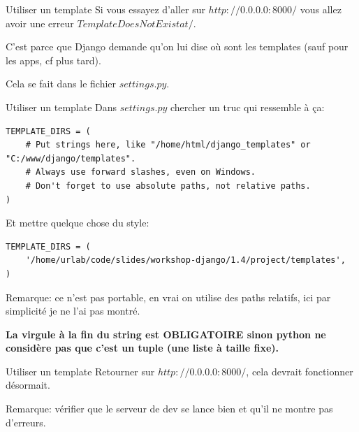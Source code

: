 \documentclass{beamer}
\begin{document}
\begin{frame}[fragile]{Utiliser un template}
    Si vous essayez d'aller sur $http://0.0.0.0:8000/$ vous allez avoir une erreur $TemplateDoesNotExist at /$.

    \vspace{3mm}

    C'est parce que Django demande qu'on lui dise où sont les templates (sauf pour les apps, cf plus tard).

    \vspace{3mm}

    Cela se fait dans le fichier $settings.py$.
\end{frame}

\begin{frame}[fragile]{Utiliser un template}
    Dans $settings.py$ chercher un truc qui ressemble à ça:

\begin{footnotesize}
    \begin{verbatim}
TEMPLATE_DIRS = (
    # Put strings here, like "/home/html/django_templates" or "C:/www/django/templates".
    # Always use forward slashes, even on Windows.
    # Don't forget to use absolute paths, not relative paths.
)
    \end{verbatim}
\end{footnotesize}\pause

Et mettre quelque chose du style:

\begin{footnotesize}
\begin{verbatim}
TEMPLATE_DIRS = (
    '/home/urlab/code/slides/workshop-django/1.4/project/templates',
)
\end{verbatim}
\end{footnotesize}\pause

Remarque: ce n'est pas portable, en vrai on utilise des paths relatifs, ici par simplicité je ne l'ai pas montré.\pause

\vspace{3mm}
\bf La virgule à la fin du string est OBLIGATOIRE sinon python ne considère pas que c'est un tuple (une liste à taille fixe).

\end{frame}

\begin{frame}[fragile]{Utiliser un template}
    Retourner sur $http://0.0.0.0:8000/$, cela devrait fonctionner désormait.

    Remarque: vérifier que le serveur de dev se lance bien et qu'il ne montre pas d'erreurs.
\end{frame}
\end{document}
